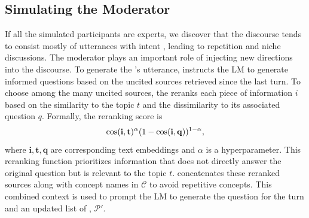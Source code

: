 \documentclass[11pt]{article}
\begin{document}
\subsection{Simulating the Moderator}
\label{sec:simulate_moderator}

If all the simulated participants are experts, we discover that the discourse tends to consist mostly of utterances with  intent , leading to repetition and niche discussions. The moderator plays an important role of injecting new directions into the discourse.  
To generate the \moderator's utterance, \system instructs the LM to generate informed questions based on the uncited sources retrieved since the last \moderator turn. To choose among the many uncited sources, the \moderator reranks each piece of information $i$ based on the similarity to the topic $t$ and the dissimilarity to its associated question $q$. 
Formally, the reranking score is 
\begin{equation}\nonumber
    \operatorname{cos}(\mathbf{i}, \mathbf{t})^{\alpha} (1- \operatorname{cos}(\mathbf{i}, \mathbf{q}))^{1-\alpha},
\vspace{-0.5em}
\label{eq:rerank_score}
\end{equation}
where $\mathbf{i}, \mathbf{t}, \mathbf{q}$ are corresponding text embeddings and $\alpha$ is a hyperparameter. This reranking function prioritizes information that does not directly answer the original question but is relevant to the topic $t$. \system concatenates these reranked sources along with concept names in $\mathcal{C}$ to avoid repetitive concepts. This combined context is used to prompt the LM to generate the question for the \moderator turn and an updated list of \experts, $\mathcal{P}'$.





\end{document}
